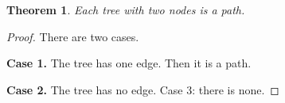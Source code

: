 \documentclass{article}
\newtheorem{theorem}{Theorem}
\begin{document}
\begin{theorem}
Each tree with two nodes is a path.
\end{theorem}
\begin{proof}
There are two cases.

\textbf{Case 1.} The tree has one edge. Then it is a path.

\textbf{Case 2.} The tree has no edge. Case 3: there is none.
\end{proof}
\end{document}
